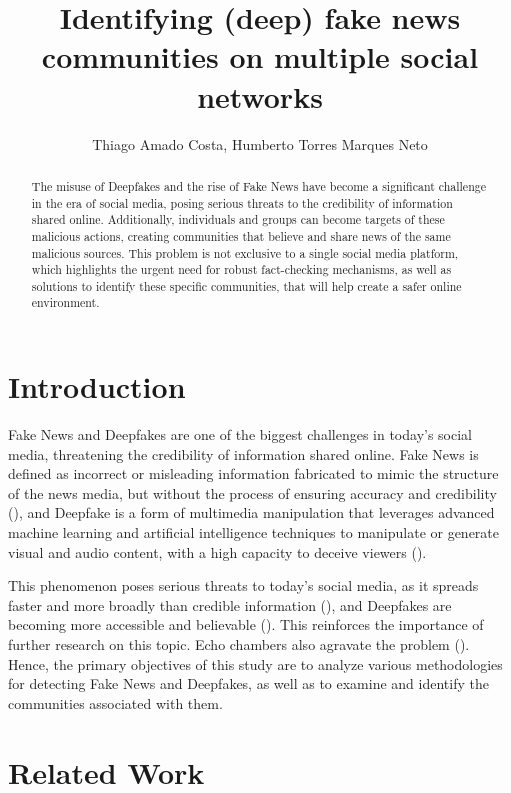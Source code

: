 \documentclass[12pt]{article}
\title{Identifying (deep) fake news communities on multiple social networks}
\author{Thiago Amado Costa\inst{1}, Humberto Torres Marques Neto\inst{1}}
\begin{document}
\maketitle

\begin{abstract}
	The misuse of Deepfakes and the rise of Fake News have become a significant challenge in the
	era of social media, posing serious threats to the credibility of information shared online.
	Additionally, individuals and groups can become targets of these malicious actions, creating
	communities that believe and share news of the same malicious sources.
	This problem is not exclusive to a single social media platform, which highlights the urgent
	need for robust fact-checking mechanisms, as well as solutions to identify these specific
	communities, that will help create a safer online environment.
\end{abstract}

\section{Introduction}

Fake News and Deepfakes are one of the biggest challenges in today's social media, threatening the
credibility of information shared online.
Fake News is defined as incorrect or misleading information fabricated to mimic the structure of
the news media, but without the process of ensuring accuracy and credibility (\cite{lazer2018science}),
and Deepfake is a form of multimedia manipulation that leverages advanced machine learning and artificial
intelligence techniques to manipulate or generate visual and audio content, with a high capacity to deceive
viewers (\cite{KIETZMANN2020135}).

This phenomenon poses serious threats to today's social media, as it spreads faster and more broadly
than credible information (\cite{doi:10.1126/science.aap9559}), and Deepfakes are becoming more
accessible and believable (\cite{KIETZMANN2020135}). This reinforces the importance of further
research on this topic.
Echo chambers also agravate the problem (\cite{Cinelli_2021}).
Hence, the primary objectives of this study are to analyze various methodologies for detecting
Fake News and Deepfakes, as well as to examine and identify the communities associated with them.

\section{Related Work}
\end{document}
